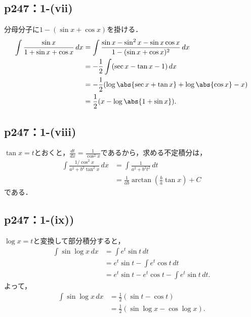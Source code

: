 \documentclass[a4paper,10pt,fleqn]{ltjsarticle}
\begin{document}
      \subsection*{p247：1-(vii)}

    \begin{leftbar}
        分母分子に$1-(\sin x + \cos x)$を掛ける．
        \begin{align*}
          \int \frac{\sin x}{1 + \sin x + \cos x} \,dx
          &= \int \frac{\sin x - \sin^2 x - \sin x\cos x}{1-(\sin x + \cos x)^2} \,dx \\
          &= -\frac{1}{2} \int (\sec x - \tan x - 1) \,dx \\
          &= -\frac{1}{2}(\log \abs{\sec x + \tan x} + \log \abs{\cos x} - x) \\
          &= \frac{1}{2}(x - \log \abs{1 + \sin x}).
        \end{align*}
      \end{leftbar}

\subsection*{p247：1-(viii)}



\begin{tleftbar}
    $\tan x = t$とおくと，$\frac{dt}{dx}= \frac{1}{\cos ^2 x}$であるから，求める不定積分は，
    \begin{align*} 
        \int \frac{1/\cos ^2 x}{a^2 + b^2 \tan ^2 x} \, dx & = \int \frac{1}{a^2+b^2 t^2} \, dt \\
        & = \frac{1}{ab} \arctan \left (\frac{b}{a} \tan x \right)+ C
    \end{align*}
    である．
\end{tleftbar}



\subsection*{p247：1-(ix))}
\begin{leftbar}
    $\log x = t$と変換して部分積分すると，
    \begin{align*}
      \int \sin \log x \,dx
      &= \int e^t \sin t \,dt \\
      &= e^t \sin t - \int e^t \cos t \,dt \\
      &= e^t \sin t - e^t \cos t - \int e^t \sin t \,dt.
    \end{align*}
    よって，
    \begin{align*}
      \int \sin \log x \,dx
      &= \frac{1}{2}(\sin t - \cos t) \\
      &= \frac{1}{2}(\sin \log x - \cos \log x).
    \end{align*}
  \end{leftbar}
\end{document}
